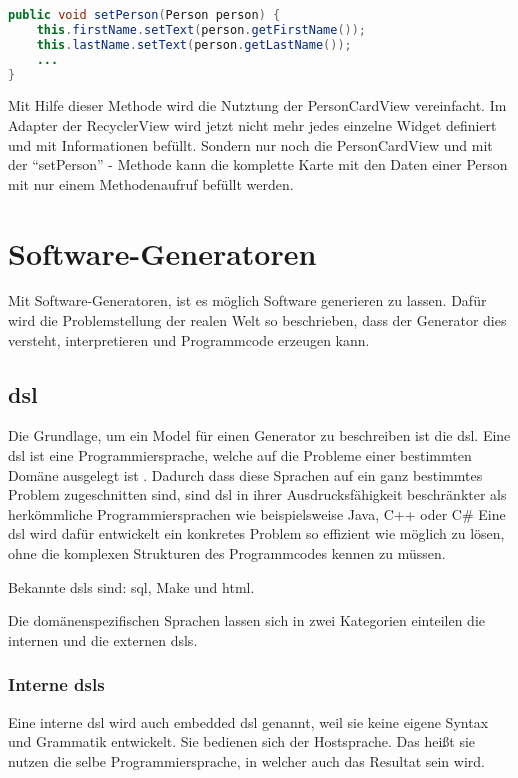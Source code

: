 \begin{lstlisting}[label=lst:setPerson,
language=java,
firstnumber=1,
caption=\enquote{setPerson} - Methode aus der PersonCardView]				   
public void setPerson(Person person) {
	this.firstName.setText(person.getFirstName());
	this.lastName.setText(person.getLastName());	
	...
}
\end{lstlisting}

Mit Hilfe dieser Methode wird die Nutztung der PersonCardView vereinfacht. Im Adapter der RecyclerView wird jetzt nicht mehr jedes einzelne Widget definiert und mit Informationen befüllt. Sondern nur noch die PersonCardView und mit der \enquote{setPerson} - Methode kann die komplette Karte mit den Daten einer Person mit nur einem Methodenaufruf befüllt werden.

\section{Software-Generatoren}\label{sec:generators}

Mit Software-Generatoren, ist es möglich Software generieren zu lassen. Dafür wird die Problemstellung der realen Welt so beschrieben, dass der Generator dies versteht, interpretieren und Programmcode erzeugen kann.

\subsection{\acf{dsl}}\label{sec:dsl}
Die Grundlage, um ein Model für einen Generator zu beschreiben ist die \acl{dsl}.
Eine \acs{dsl} ist eine Programmiersprache, welche auf die Probleme einer bestimmten Domäne ausgelegt ist \cite{dslHudak}. Dadurch dass diese Sprachen auf ein ganz bestimmtes Problem zugeschnitten sind, sind \acl{dsl} in ihrer Ausdrucksfähigkeit beschränkter als herkömmliche Programmiersprachen wie beispielsweise Java, C++ oder C\# Eine \acl{dsl} wird dafür entwickelt ein konkretes Problem so effizient wie möglich zu lösen, ohne die komplexen Strukturen des Programmcodes kennen zu müssen.

Bekannte \aclp{dsl} sind: \ac{sql}, Make und \acf{html}.

Die domänenspezifischen Sprachen lassen sich in zwei Kategorien einteilen die internen und die externen \acsp{dsl}.

\subsubsection{Interne \acsp{dsl}} \label{sec:intern}
Eine interne \acs{dsl} wird auch embedded \acs{dsl} genannt, weil sie keine eigene Syntax und Grammatik entwickelt. Sie bedienen sich der Hostsprache. Das heißt sie nutzen die selbe Programmiersprache, in welcher auch das Resultat sein wird.

